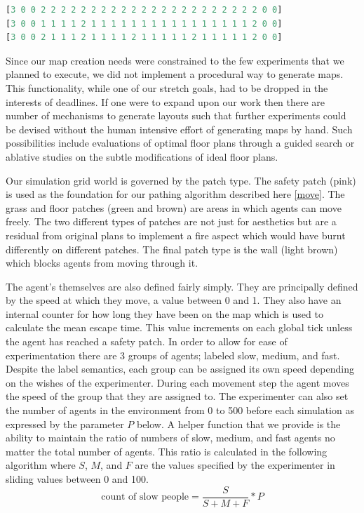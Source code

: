 \documentclass[12pt,letterpaper]{article}
\begin{document}
\begin{minipage}{\linewidth}
\begin{lstlisting}[language=lisp, caption={Example map file, 3 rows},captionpos=b, frame=single, basicstyle=\small]
[3 0 0 2 2 2 2 2 2 2 2 2 2 2 2 2 2 2 2 2 2 2 2 2 2 0 0]
[3 0 0 1 1 1 1 2 1 1 1 1 1 1 1 1 1 1 1 1 1 1 1 1 2 0 0]
[3 0 0 2 1 1 1 2 1 1 1 1 2 1 1 1 1 1 2 1 1 1 1 1 2 0 0]
\end{lstlisting}
\end{minipage}

Since our map creation needs were constrained to the few experiments that we planned to execute, we did not implement a procedural way to generate maps.  This functionality, while one of our stretch goals, had to be dropped in the interests of deadlines.  If one were to expand upon our work then there are number of mechanisms to generate layouts \cite{mirahmadiNovelAlgorithmRealtime2012} such that further experiments could be devised without the human intensive effort of generating maps by hand.  Such possibilities include evaluations of optimal floor plans through a guided search or ablative studies on the subtle modifications of ideal floor plans.

Our simulation grid world is governed by the patch type.  The safety patch (pink) is used as the foundation for our pathing algorithm described here \ref{move}.  The grass and floor patches (green and brown) are areas in which agents can  move freely.  The two different types of patches are not just for aesthetics but are a residual from original plans to implement a fire aspect which would have burnt differently on different patches.  The final patch type is the wall (light brown) which blocks agents from moving through it.

The agent's themselves are also defined fairly simply.  They are principally defined by the speed at which they move, a value between 0 and 1.  They also have an internal counter for how long they have been on the map which is used to calculate the mean escape time.  This value increments on each global tick unless the agent has reached a safety patch.  In order to allow for ease of experimentation there are 3 groups of agents; labeled slow, medium, and fast.  Despite the label semantics, each group can be assigned its own speed depending on the wishes of the experimenter.  During each movement step the agent moves the speed of the group that they are assigned to.  The experimenter can also set the number of agents in the environment from 0 to 500 before each simulation as expressed by the parameter $P$ below.  A helper function that we provide is the ability to maintain the ratio of numbers of slow, medium, and fast agents no matter the total number of agents.  This ratio is calculated in the following algorithm where $S$, $M$, and $F$ are the values specified by the experimenter in sliding values between 0 and 100.
\begin{equation}
\text{count of slow people} =\frac { S} {S + M + F} * P
\end{equation}
\end{document}

